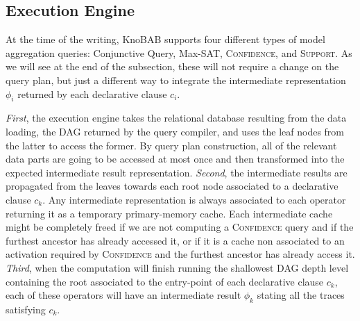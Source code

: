 
\subsection{Execution Engine} \label{ssec:xltlf}
At the time of the writing, KnoBAB supports four different types of model aggregation queries: Conjunctive Query, Max-SAT, \textsc{Confidence}, and \textsc{Support}. As we will see at the end of the subsection, these will not require a change on the query plan, but just a different way to integrate the intermediate representation $\phi_i$ returned by each declarative clause $c_i$. 

\textit{First}, the execution engine takes the relational database resulting from the data loading, the DAG returned by the query compiler, and uses the leaf nodes from the latter to access the former. By query plan construction, all of the relevant data parts are going to be accessed at most once and then transformed into the expected intermediate result representation. \textit{Second}, the intermediate results are propagated from the leaves towards each root node associated to a declarative clause $c_k$. Any intermediate representation is always associated to each operator returning it as a temporary primary-memory cache. Each intermediate cache  might be completely freed if we are not computing a  \textsc{Confidence} query and if the furthest ancestor has already accessed it, or if it is a cache non associated to an activation required by \textsc{Confidence} and the furthest ancestor has already access it. \textit{Third}, when the computation will finish running the shallowest DAG depth level containing the \xLTLf root associated to the entry-point of each declarative clause $c_k$, each of these operators will have an intermediate result $\phi_k$ stating all the traces satisfying $c_k$.

